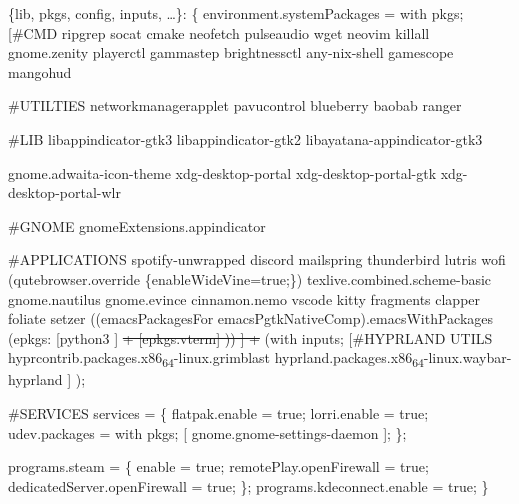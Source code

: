 \documentclass[11pt]{article}
\author{John Doe}
\date{\today}
\title{}
\begin{document}
\tableofcontents

\{lib, pkgs, config, inputs, \ldots{}\}:
\{
  environment.systemPackages =
    with pkgs;
    [\#CMD
      ripgrep
      socat
      cmake
      neofetch
      pulseaudio
      wget
      neovim
      killall
      gnome.zenity
      playerctl
      gammastep
      brightnessctl
      any-nix-shell
      gamescope
      mangohud

\#UTILTIES
networkmanagerapplet
pavucontrol
blueberry
baobab
ranger

\#LIB
libappindicator-gtk3
libappindicator-gtk2
libayatana-appindicator-gtk3

gnome.adwaita-icon-theme
xdg-desktop-portal
xdg-desktop-portal-gtk
xdg-desktop-portal-wlr

\#GNOME
gnomeExtensions.appindicator

  \#APPLICATIONS
  spotify-unwrapped
  discord
  mailspring
  thunderbird
  lutris
  wofi
  (qutebrowser.override \{enableWideVine=true;\})
  texlive.combined.scheme-basic
  gnome.nautilus
  gnome.evince
  cinnamon.nemo
  vscode
  kitty
  fragments
  clapper
  foliate
  setzer
  ((emacsPackagesFor emacsPgtkNativeComp).emacsWithPackages (epkgs:
    [python3
    ]
    \sout{+
    [epkgs.vterm]
  ))
  ]
+}
(with inputs;
[\#HYPRLAND UTILS
  hyprcontrib.packages.x86\textsubscript{64}-linux.grimblast
  hyprland.packages.x86\textsubscript{64}-linux.waybar-hyprland
]
);

\#SERVICES
services =
\{
  flatpak.enable = true;
  lorri.enable = true;
  udev.packages = with pkgs; [ gnome.gnome-settings-daemon ];
\};

  programs.steam = \{
    enable = true;
    remotePlay.openFirewall = true; 
    dedicatedServer.openFirewall = true;
  \};
  programs.kdeconnect.enable = true;
\}
\end{document}
